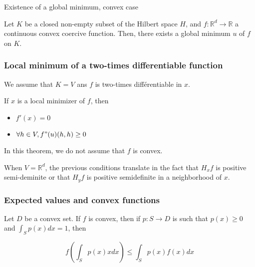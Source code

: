 \documentclass[
10pt, %
a4paper, %
oneside, %
headinclude,footinclude, %
BCOR5mm, %
]{scrartcl}
\begin{document}
\begin{theorem}{Existence of a global minimum, convex case}
    \label{th:alphaconv}

    Let $K$ be a closed non-empty subset of the Hilbert space $H$, and $f: \mathbb{R}^d\rightarrow \mathbb{R} $ a continuous convex coercive function. Then, there exists a global minimum $u$ of $f$ on $K$.

\end{theorem}

\subsubsection{\large\color{Periwinkle}Local minimum of a two-times differentiable function}

\begin{theorem}
    
We assume that $K=V$ ans $f$ is two-times différentiable in $x$.

If $x$ is a local minimizer of $f$, then
\begin{itemize}
    \item $f'(x)=0$
    \item $\forall h\in V, f"(u)(h,h)\geq 0$
\end{itemize}


\end{theorem}

\begin{remark}
    
    In this theorem, we do not assume that $f$ is convex.
\end{remark}

\begin{remark}
   When  $V= \mathbb{R}^d$, the previous conditions translate in the fact that $H_xf$ is positive semi-deminite or that $H_yf$ is positive semidefinite in a neighborhood of $x$. 
\end{remark}


\subsubsection{\large\color{Periwinkle}Expected values and convex functions}

Let $D$ be a convex set. If $f$ is convex, then if $p: S\rightarrow D$ is such that $p(x)\geq 0$ and $ \int_{S} p(x)  dx =1$, then

\begin{equation*}
    f( \int_{S} p(x)x  dx)\leq \int_{S} p(x)f(x)  dx
\end{equation*}
\end{document}
